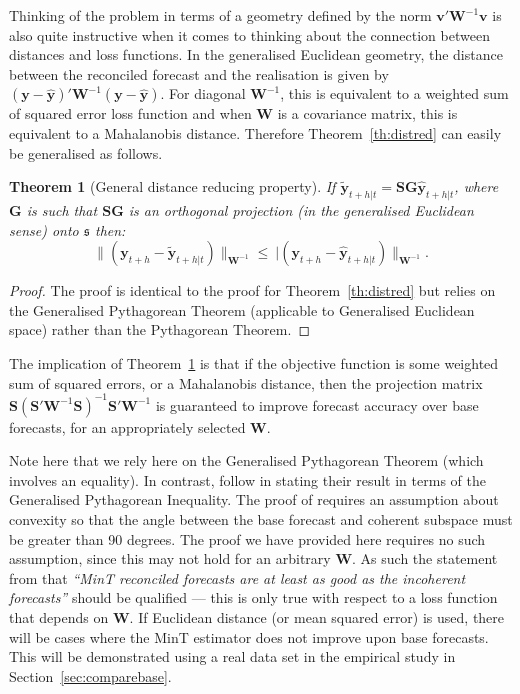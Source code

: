 \documentclass[12pt]{article}
\newtheorem{theo}{Theorem}[section]
\theoremstyle{definition}
\begin{document}
Thinking of the problem in terms of a geometry defined by the norm $\bm{v}'\bm{W}^{-1}\bm{v}$ is also quite instructive when it comes to thinking about the connection between distances and loss functions. In the generalised Euclidean geometry, the distance between the reconciled forecast and the realisation is given by $(\bm{y}-\hat{\bm{y}})'\bm{W}^{-1}(\bm{y}-\hat{\bm{y}})$. For diagonal $\bm{W}^{-1}$, this is equivalent to a weighted sum of squared error loss function and when $\bm{W}$ is a covariance matrix, this is equivalent to a Mahalanobis distance. Therefore Theorem~\ref{th:distred} can easily be generalised as follows.

\begin{theo}[General distance reducing property]\label{th:gdistred}
  If $\tilde{\bm{y}}_{t+h|t}=\bm{S}\bm{G}\hat{\bm{y}}_{t+h|t}$, where $\bm{G}$ is such that $\bm{S}\bm{G}$ is an orthogonal projection (in the generalised Euclidean sense) onto $\mathfrak{s}$ then:
  \begin{equation*}
    \|(\bm{y}_{t+h}-\tilde{\bm{y}}_{t+h|t})\|_{{\bm W}^{-1}}
      \le\
    |(\bm{y}_{t+h}-\hat{\bm{y}}_{t+h|t})\|_{{\bm W}^{-1}}.
  \end{equation*}
\end{theo}
\begin{proof}
  The proof is identical to the proof for Theorem~\ref{th:distred} but relies on the Generalised Pythagorean Theorem (applicable to Generalised Euclidean space) rather than the Pythagorean Theorem.
  \end{proof}

The implication of Theorem~\ref{th:gdistred} is that if the objective function is some weighted sum of squared errors, or a Mahalanobis distance, then the projection matrix $\bm{S}(\bm{S}'\bm{W}^{-1}\bm{S})^{-1}\bm{S}'\bm{W}^{-1}$ is guaranteed to improve forecast accuracy over base forecasts, for an appropriately selected $\bm{W}$.

Note here that we rely here on the Generalised Pythagorean Theorem (which involves an equality). In contrast, \citet{WicEtAl2019} follow \citet{VanErven2015a} in stating their result in terms of the Generalised Pythagorean Inequality. The proof of \citet{WicEtAl2019} requires an assumption about convexity so that the angle between the base forecast and coherent subspace must be greater than 90 degrees. The proof we have provided here requires no such assumption, since this may not hold for an arbitrary $\bm{W}$. As such the statement from \citet{WicEtAl2019} that \emph{``MinT reconciled forecasts are at least as good as the incoherent forecasts''} should be qualified ---  this is only true with respect to a loss function that depends on $\bm{W}$. If Euclidean distance (or mean squared error) is used, there will be cases where the MinT estimator does not improve upon base forecasts. This will be demonstrated using a real data set in the empirical study in Section~\ref{sec:comparebase}.
\end{document}
